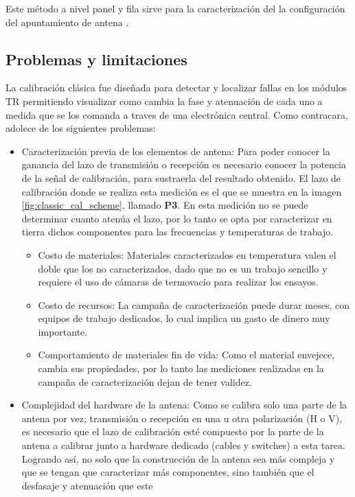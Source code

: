 Este método a nivel panel y fila sirve para la caracterización del la configuración del apuntamiento de antena \cite{Br2007}.

\subsection{Problemas y limitaciones}

La calibración clásica fue diseñada para detectar y localizar fallas en los módulos TR permitiendo visualizar como cambia la
fase y atenuación de cada uno a medida que se los comanda a traves de una electrónica central. Como contracara, adolece de
los siguientes problemas:

\begin{itemize}
	\item Caracterización previa de los elementos de antena: Para poder conocer la ganancia del lazo de transmisión o recepción
es necesario conocer la potencia de la señal de calibración, para sustraerla del resultado obtenido. El lazo de calibración
donde se realiza esta medición es el que se muestra en la imagen \ref{fig:classic_cal_scheme}, llamado \textbf{P3}. En esta
medición no se puede determinar cuanto atenúa el lazo, por lo tanto se opta por caracterizar en tierra dichos componentes
para las frecuencias y temperaturas de trabajo.
	\begin{itemize}
		\item Costo de materiales: Materiales caracterizados en temperatura valen el doble que los no caracterizados, 
			dado que no es un trabajo sencillo y requiere el uso de cámaras de termovacío para realizar los ensayos.
		\item Costo de recursos: La campaña de caracterización puede durar meses, con equipos de trabajo dedicados, lo cual implica
			un gasto de dinero muy importante.
		\item Comportamiento de materiales fin de vida: Como el material envejece, cambia sus propiedades, por lo tanto las mediciones realizadas
			en la campaña de caracterización dejan de tener validez.
	\end{itemize}
	\item Complejidad del hardware de la antena: Como se calibra solo una parte de la antena por vez, transmisión o recepción en
		una u otra polarización (H o V), es necesario que el lazo de calibración esté compuesto por la parte de la antena a
		calibrar junto a hardware dedicado (cables y switches) a esta tarea. Logrando así, no solo que la construcción de la antena
		sea más compleja y que se tengan que caracterizar más componentes, sino también que el desfasaje y atenuación que este

\end{itemize}
